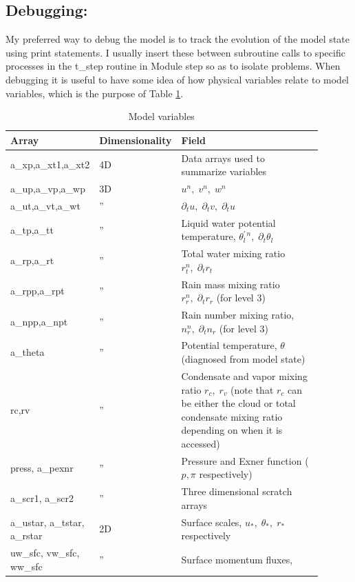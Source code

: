 \documentclass[11pt,a4paper]{article}
\begin{document}
\subsection{Debugging:}

My preferred way to debug the model is to track the evolution of the
model state using print statements.  I usually insert these between
subroutine calls to specific processes in the t\_step routine in
Module step so as to isolate problems.  When debugging it is useful to
have some idea of how physical variables relate to model variables,
which is the purpose of Table \ref{tbl:variables}.

\begin{longtable}[htb]{p{0.15\linewidth}p{0.15\linewidth}p{0.6\linewidth}}
\caption{Model variables} \label{tbl:variables}
\\ \hline \hline 
Array    & Dimensionality & Field \\ \hline \endhead
a\_xp,a\_xt1,a\_xt2 & 4D    & Data arrays used to summarize variables\\
a\_up,a\_vp,a\_wp & 3D    & $u^n, \; v^n, \;w^n$ \\
a\_ut,a\_vt,a\_wt & ''    & $\partial_t u, \; \partial_t v, 
\; \partial_t u$ \\  
a\_tp,a\_tt  & ''         & Liquid water potential temperature,
$\theta_l^{'\, n}, \;  \partial_t \theta_l$ \\ 
a\_rp,a\_rt  & ''         & Total water mixing ratio $r_t^n, \;
\partial_t r_t$ \\ 
a\_rpp,a\_rpt  & ''       & Rain mass mixing ratio $r_r^n, \;
\partial_t r_r$   (for level 3)\\  
a\_npp,a\_npt  & ''       & Rain number mixing ratio, $n_r^n, \;
\partial_t n_r$ (for level 3) \\  
a\_theta & '' & Potential temperature, $\theta$ (diagnosed from model state)\\  
rc,rv  & ''         & Condensate and vapor mixing ratio $r_c, \;
r_v$ (note that $r_c$ can be either the cloud or total condensate
mixing ratio depending on when it is accessed) \\ 
press, a\_pexnr & ''   & Pressure and Exner function ($p, \pi$ respectively)  \\  
a\_scr1, a\_scr2 & '' & Three dimensional scratch arrays \\
a\_ustar, a\_tstar, a\_rstar & 2D & Surface scales, $u_*, \;
\theta_*, \; r_*$ respectively \\ 
uw\_sfc, vw\_sfc, ww\_sfc & '' & Surface momentum fluxes,

\end{longtable}
\end{document}
